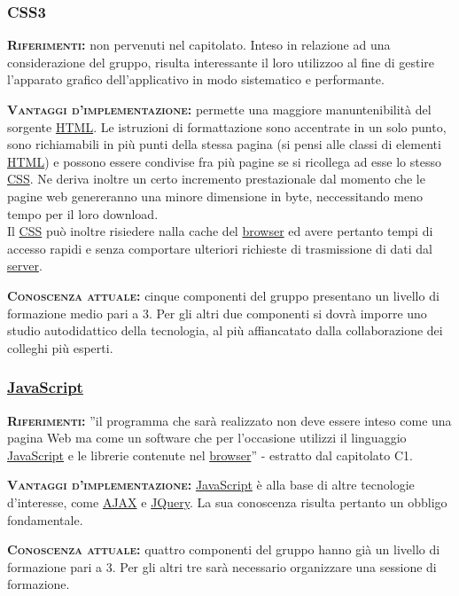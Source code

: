 \subsubsection{CSS3}
\begin{description}
	\item{\scshape\bfseries Riferimenti:} non pervenuti nel capitolato. Inteso in relazione ad una considerazione del gruppo, risulta interessante il loro utilizzoo al fine di gestire l'apparato grafico dell'applicativo in modo sistematico e performante.
	
\item{\scshape\bfseries Vantaggi d'implementazione:} permette una maggiore manuntenibilità del sorgente \underline{HTML}. Le istruzioni di formattazione sono accentrate in un solo punto, sono richiamabili in più punti della stessa pagina (si pensi alle classi di elementi \underline{HTML}) e possono essere condivise fra più pagine se si ricollega ad esse lo stesso \underline{CSS}\@. Ne deriva inoltre un certo incremento prestazionale dal momento che le pagine web genereranno una minore dimensione in byte, neccessitando meno tempo per il loro download. \\Il \underline{CSS} può inoltre risiedere nalla cache del \underline{browser} ed avere pertanto tempi di accesso rapidi e senza comportare ulteriori richieste di trasmissione di dati dal \underline{server}.
	
	\item{\scshape\bfseries Conoscenza attuale:} cinque componenti del gruppo presentano un livello di formazione medio pari a 3. Per gli altri due componenti si dovrà imporre uno studio autodidattico della tecnologia, al più affiancatato dalla collaborazione dei colleghi più esperti.
\end{description}

\subsubsection{\underline{JavaScript}}
\begin{description} 
	\item{\scshape\bfseries Riferimenti:}
  ''il programma che sarà realizzato non deve essere inteso come una pagina Web ma come un software che per l'occasione utilizzi il linguaggio \underline{JavaScript} e le librerie contenute nel \underline{browser}'' - estratto dal capitolato C1.

	\item{\scshape\bfseries Vantaggi d'implementazione:} \underline{JavaScript} è alla base di altre tecnologie d'interesse, come \underline{AJAX} e \underline{JQuery}. La sua conoscenza risulta pertanto un obbligo fondamentale.

	\item{\scshape\bfseries Conoscenza attuale:} quattro componenti del gruppo hanno già un livello di formazione pari a 3. Per gli altri tre sarà necessario organizzare una sessione di formazione.
\end{description}

